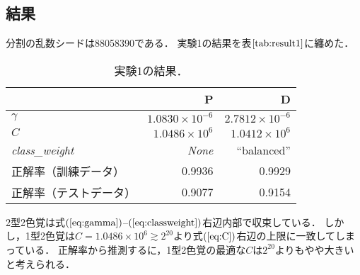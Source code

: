 \documentclass[uplatex,paper=a4,fontsize=4.0truemm,jafontsize=4.0truemm,head_space=30.0truemm,foot_space=30.0truemm,baselineskip=8.0truemm,line_length=40zw,gutter=25.0truemm,oneside,openany,fleqn,hanging_panctuation,open_bracket_pos=nibu_tentsuki,dvipdfmx,jis2004,book,titlepage]{jlreq}
\theoremstyle{mystyle}
\newcommand{\captiondot}[1]{\caption{#1．}}
\newcommand{\tableinput}[4]{\begin{table}[tbp]\centering\captiondot{#3}\label{tab:#4}\begin{tabular}{#1}#2\end{tabular}\end{table}}
\newcommand{\mathdisplaystyle}[1]{\(\displaystyle{#1}\)}
\newcommand{\Reference}[1]{\mathdisplaystyle{\ref{#1}}}
\newcommand{\Equationreference}[1]{\mathdisplaystyle{\parentheses{\ref{#1}}}}
\newcommand{\parentheses}[1]{\left(#1\right)}
\begin{document}
			\subsection{結果}
				分割の乱数シードは88058390である．
				実験1の結果を表\Reference{tab:result1}に纏めた．
				\tableinput{l|rr}{ & P & D \\ \hline
					\mathdisplaystyle{\gamma} & \mathdisplaystyle{1.0830\times{10}^{-6}} & \mathdisplaystyle{2.7812\times{10}^{-6}} \\
					\mathdisplaystyle{C} & \mathdisplaystyle{1.0486\times{10}^6} & \mathdisplaystyle{1.0412\times{10}^6} \\
					\textit{class\_weight} & \textit{None} & ``balanced'' \\
					正解率（訓練データ） & 0.9936 & 0.9929 \\
					正解率（テストデータ） & 0.9077 & 0.9154}{実験1の結果}{result1}

				2型2色覚は式\Equationreference{eq:gamma}--\Equationreference{eq:classweight}右辺内部で収束している．
				しかし，1型2色覚は\mathdisplaystyle{C=1.0486\times10^6\gtrsim2^{20}}より式\Equationreference{eq:C}右辺の上限に一致してしまっている．
				正解率から推測するに，1型2色覚の最適な\mathdisplaystyle{C}は\mathdisplaystyle{2^{20}}よりもやや大きいと考えられる．
\end{document}
